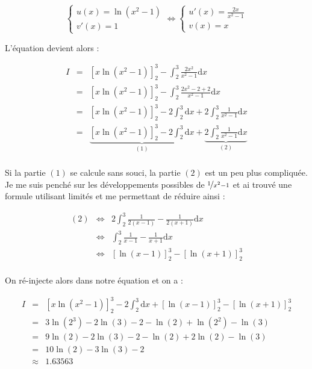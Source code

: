 \documentclass[a4paper, 11pt]{report} %
\newcommand{\dx}{\mathrm{d}x}
\begin{document}
\[
\left\{
\begin{array}{l}
u(x) = \ln(x^2-1)\\
v'(x) = 1
\end{array}
\right.
\Leftrightarrow
\left\{
\begin{array}{l}
u'(x) = \frac{2x}{x^2-1}\\ 
v(x) = x
\end{array}
\right.
\]

L'équation devient alors :

\begin{eqnarray*}
I & = & \left[x\ln(x^2-1)\right]_2^3 - \int_2^3\frac{2x^2}{x^2-1}\dx\\
& = & \left[x\ln(x^2-1)\right]_2^3 - \int_2^3\frac{2x^2 - 2 + 2}{x^2-1}\dx\\
& = & \left[x\ln(x^2-1)\right]_2^3 - 2\int_2^3\dx+2\int_2^3\frac{1}{x^2-1}\dx\\
& = & \underbrace{\left[x\ln(x^2-1)\right]_2^3 - 2\int_2^3\dx}_{(1)} + \underbrace{2\int_2^3\frac{1}{x^2-1}\dx}_{(2)}\\
\end{eqnarray*}

Si la partie $(1)$ se calcule sans souci, la partie $(2)$ est un peu plus compliquée.
Je me suis penché sur les développements possibles de $\nicefrac{1}{x^2-1}$ et ai trouvé une formule utilisant limités
et me permettant de réduire ainsi :

\begin{eqnarray*}
(2) & \Leftrightarrow & 2\int_2^3\frac{1}{2(x-1)}-\frac{1}{2(x+1)}\dx\\
& \Leftrightarrow & \int_2^3\frac{1}{x-1}-\frac{1}{x+1}\dx\\
& \Leftrightarrow & \left[\ln(x-1)\right]_2^3-\left[\ln(x+1)\right]_2^3\\
\end{eqnarray*}

On ré-injecte alors dans notre équation et on a :

\begin{eqnarray*}
I & = & \left[x\ln(x^2-1)\right]_2^3 - 2\int_2^3\dx + \left[\ln(x-1)\right]_2^3-\left[\ln(x+1)\right]_2^3\\
& = & 3\ln(2^3)-2\ln(3)-2-\ln(2)+\ln(2^2)-\ln(3)\\
& = & 9\ln(2) - 2\ln(3)-2-\ln(2)+2\ln(2)-\ln(3)\\
& = & 10\ln(2) - 3\ln(3) -2\\
& \approx & 1.63563
\end{eqnarray*}
\end{document}
